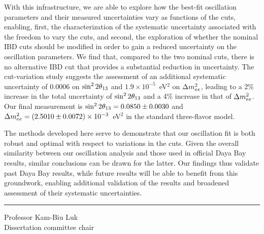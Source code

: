 With this infrastructure, we are able to explore how the best-fit oscillation parameters and their measured uncertainties vary as functions of the cuts, enabling, first, the characterization of the systematic uncertainty associated with the freedom to vary the cuts, and second, the exploration of whether the nominal IBD cuts should be modified in order to gain a reduced uncertainty on the oscillation parameters. We find that, compared to the two nominal cuts, there is no alternative IBD cut that provides a substantial reduction in uncertainty. The cut-variation study suggests the assessment of an additional systematic uncertainty of 0.0006 on $\sin^2 2\theta_{13}$ and $1.9\times10^{-5}$~eV$^2$ on $\Delta m^2_{ee}$, leading to a 2\% increase in the total uncertainty of $\sin^2 2\theta_{13}$ and a 4\% increase in that of $\Delta m^2_{ee}$. Our final measurement is $\sin^2 2\theta_{13} = 0.0850 \pm 0.0030$ and $\Delta m^2_{ee} = (2.5010 \pm 0.0072) \times 10^{-3}$~eV$^2$ in the standard three-flavor model.

The methods developed here serve to demonstrate that our oscillation fit is both robust and optimal with respect to variations in the cuts. Given the overall similarity between our oscillation analysis and those used in official Daya Bay results, similar conclusions can be drawn for the latter. Our findings thus validate past Daya Bay results, while future results will be able to benefit from this groundwork, enabling additional validation of the results and broadened assessment of their systematic uncertainties.

%

\SingleSpacing
\vspace{2.5\baselineskip}
\hfill
\begin{minipage}{0.4\textwidth}
  \hrule\vspace{0.4\baselineskip}
  Professor Kam-Biu Luk\\
  Dissertation committee chair
\end{minipage}

\clearpage
